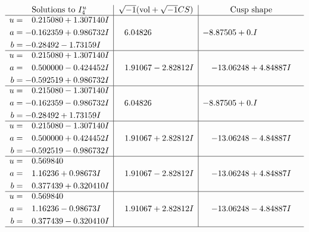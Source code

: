 \documentclass[1p]{elsarticle_modified}
\theoremstyle{definition}
\newcommand{\I}{\sqrt{-1}}
\begin{document}
$$\begin{array}{c|c|c}  
\text{Solutions to }I^u_{4}& \I (\text{vol} + \sqrt{-1}CS) & \text{Cusp shape}\\
 \hline 
\begin{aligned}
u &= \phantom{-}0.215080 + 1.307140 I \\
a &= -0.162359 + 0.986732 I \\
b &= -0.28492 - 1.73159 I\end{aligned}
 & \phantom{-}6.04826\phantom{ +0.000000I} & -8.87505 + 0. I\phantom{ +0.000000I} \\ \hline\begin{aligned}
u &= \phantom{-}0.215080 + 1.307140 I \\
a &= \phantom{-}0.500000 - 0.424452 I \\
b &= -0.592519 + 0.986732 I\end{aligned}
 & \phantom{-}1.91067 - 2.82812 I & -13.06248 + 4.84887 I \\ \hline\begin{aligned}
u &= \phantom{-}0.215080 - 1.307140 I \\
a &= -0.162359 - 0.986732 I \\
b &= -0.28492 + 1.73159 I\end{aligned}
 & \phantom{-}6.04826\phantom{ +0.000000I} & -8.87505 + 0. I\phantom{ +0.000000I} \\ \hline\begin{aligned}
u &= \phantom{-}0.215080 - 1.307140 I \\
a &= \phantom{-}0.500000 + 0.424452 I \\
b &= -0.592519 - 0.986732 I\end{aligned}
 & \phantom{-}1.91067 + 2.82812 I & -13.06248 - 4.84887 I \\ \hline\begin{aligned}
u &= \phantom{-}0.569840\phantom{ +0.000000I} \\
a &= \phantom{-}1.16236 + 0.98673 I \\
b &= \phantom{-}0.377439 + 0.320410 I\end{aligned}
 & \phantom{-}1.91067 - 2.82812 I & -13.06248 + 4.84887 I \\ \hline\begin{aligned}
u &= \phantom{-}0.569840\phantom{ +0.000000I} \\
a &= \phantom{-}1.16236 - 0.98673 I \\
b &= \phantom{-}0.377439 - 0.320410 I\end{aligned}
 & \phantom{-}1.91067 + 2.82812 I & -13.06248 - 4.84887 I\\
 \hline 
 \end{array}$$\newpage
\end{document}
